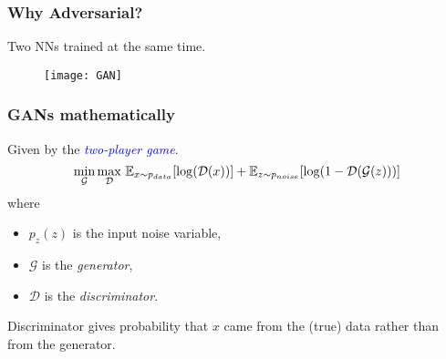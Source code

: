 \documentclass[aspectratio=149]{beamer}
\newcommand{\G}{\mathcal{G}}
\renewcommand{\D}{\mathcal{D}}
\begin{document}
\begin{frame}
  \frametitle{Why Adversarial?}
  Two NNs trained at the same time.
  \begin{figure}[ht]
    \centering
    \texttt{[image: GAN]}
  \end{figure}
\end{frame}


\begin{frame}
  \frametitle{GANs mathematically}
  Given by the \textcolor{blue}{\emph{two-player game}}.
  \begin{equation}
    \min_{\G} \max_{\D} \, \E_{x\sim p_{data}} [\log(\D(x))] + \E_{z\sim p_{noise}}
    [\log(1- \D(\G(z)))]
  \end{equation}
  where
  \begin{itemize}
    \item $p_{z}(z)$ is the input noise variable,
    \item $\G$ is the \emph{generator},
    \item $\D$ is the \emph{discriminator}.
  \end{itemize}
  \begin{block}{}
    Discriminator gives probability that $x$ came from the (true) data rather than
    from the generator.
  \end{block}
\end{frame}
\end{document}
